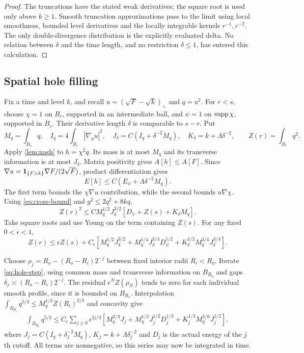 \begin{proof}
The truncations have the stated weak derivatives; the square root is used only above $k\ge1$. Smooth truncation approximations pass to the limit using local smoothness, bounded level derivatives and the locally integrable kernels $r^{-1},r^{-2}$. The only double-divergence distribution is the explicitly evaluated delta. No relation between $\delta$ and the time length, and no restriction $\delta\le1$, has entered this calculation.
\end{proof}

\subsection{Spatial hole filling}

Fix a time and level $k$, and recall $u=(\sqrt F-\sqrt k)_+$ and $q=u^2$. For $r<s$, choose $\chi=1$ on $B_r$, supported in an intermediate ball, and $\psi=1$ on $\operatorname{supp}\chi$, supported in $B_s$. Their derivative length $\delta$ is comparable to $s-r$. Put
\[
 M_q=\int_{B_s}q,\quad I_q=4\int_{B_s}|\nabla_yu|^2,\quad
 J_\delta=C(I_q+\delta^{-2}M_q),\quad K_\delta=k+\Lambda\delta^{-2},
 \qquad Z(r)=\int_{B_r}q^2.
\]
Apply \cref{lem:nash} to $h=\chi^2q$. Its mass is at most $M_q$ and its transverse information is at most $J_\delta$. Matrix positivity gives $A[h]\le A[F]$. Since $\nabla u=\mathbf 1_{\{F>k\}}\nabla F/(2\sqrt F)$, product differentiation gives
\[
 E[h]\le C(E_\psi+\Lambda\delta^{-2}M_q).
\]
The first term bounds the $\chi\nabla u$ contribution, while the second bounds $u\nabla\chi$. Using \eqref{eq:cross-bound} and $g^2\le2q^2+8kq$,
\[
 Z(r)^2\le CM_q^{1/2}J_\delta^{3/2}
 [D_\psi+Z(s)+K_\delta M_q].
\]
Take square roots and use Young on the term containing $Z(s)$. For any fixed $0<\epsilon<1$,
\begin{equation}\label{eq:hole-step}
 Z(r)\le\epsilon Z(s)+C_\epsilon
 [M_q^{1/2}J_\delta^{3/2}
 +M_q^{1/4}J_\delta^{3/4}D_\psi^{1/2}
 +K_\delta^{1/2}M_q^{3/4}J_\delta^{3/4}].
\end{equation}

Choose $\rho_j=R_o-(R_o-R_i)2^{-j}$ between fixed interior radii $R_i<R_o$. Iterate \eqref{eq:hole-step}, using common mass and transverse information on $B_{R_o}$ and gaps $\delta_j\asymp(R_o-R_i)2^{-j}$. The residual $\epsilon^NZ(\rho_N)$ tends to zero for each individual smooth profile, since it is bounded on $B_{R_o}$. Interpolation
$\int_{B_{R_i}}q^{5/3}\le M_q^{1/3}Z(R_i)^{2/3}$ and concavity give
\begin{align}\label{eq:hole-series}
 \int_{B_{R_i}}q^{5/3}\le C_\epsilon\sum_{j\ge0}\epsilon^{2j/3}
 [M_q^{2/3}J_j+M_q^{1/2}J_j^{1/2}D_j^{1/3}
 +K_j^{1/3}M_q^{5/6}J_j^{1/2}],
\end{align}
where $J_j=C(I_q+\delta_j^{-2}M_q)$, $K_j=k+\Lambda\delta_j^{-2}$ and $D_j$ is the actual energy of the $j$th cutoff. All terms are nonnegative, so this series may now be integrated in time.

